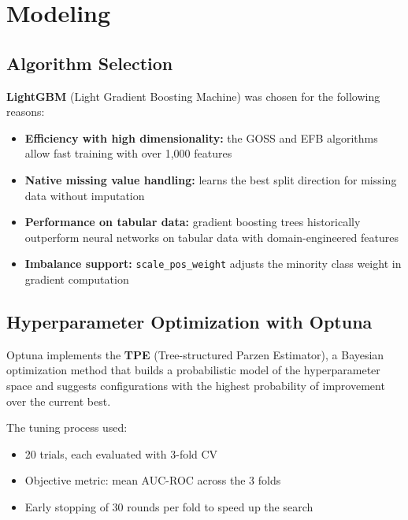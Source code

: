 \documentclass[12pt, a4paper]{article}
\begin{document}
\section{Modeling}

\subsection{Algorithm Selection}

\textbf{LightGBM} (Light Gradient Boosting Machine) was chosen for the following reasons:

\begin{itemize}
    \item \textbf{Efficiency with high dimensionality:} the GOSS and EFB algorithms
          allow fast training with over 1,000 features
    \item \textbf{Native missing value handling:} learns the best split direction for
          missing data without imputation
    \item \textbf{Performance on tabular data:} gradient boosting trees historically
          outperform neural networks on tabular data with domain-engineered features
    \item \textbf{Imbalance support:} \texttt{scale\_pos\_weight} adjusts the minority
          class weight in gradient computation
\end{itemize}

\subsection{Hyperparameter Optimization with Optuna}

Optuna implements the \textbf{TPE} (Tree-structured Parzen Estimator), a Bayesian
optimization method that builds a probabilistic model of the hyperparameter space and
suggests configurations with the highest probability of improvement over the current best.

The tuning process used:
\begin{itemize}
    \item 20 trials, each evaluated with 3-fold CV
    \item Objective metric: mean AUC-ROC across the 3 folds
    \item Early stopping of 30 rounds per fold to speed up the search
\end{itemize}
\end{document}
